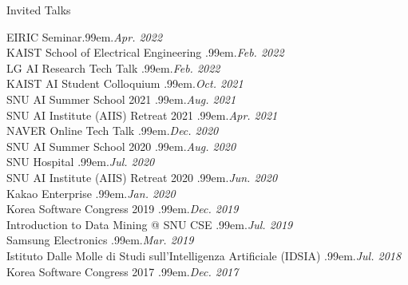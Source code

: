 \documentclass{resume} %
\makeatletter
\newcommand \Dotfill {\leavevmode \cleaders \hb@xt@ .99em{\hss .\hss }\hfill \kern \z@}
\makeatother
\begin{document}
\begin{rSection}{Invited Talks}

EIRIC Seminar\smallskip \Dotfill \emph{Apr. 2022} \\ 
KAIST School of Electrical Engineering \smallskip \Dotfill \emph{Feb. 2022} \\ 
LG AI Research Tech Talk \smallskip \Dotfill \emph{Feb. 2022} \\ 
KAIST AI Student Colloquium \smallskip \Dotfill \emph{Oct. 2021} \\ 
SNU AI Summer School 2021 \smallskip \Dotfill \emph{Aug. 2021} \\ 
SNU AI Institute (AIIS) Retreat 2021 \smallskip \Dotfill \emph{Apr. 2021} \\ 
NAVER Online Tech Talk \smallskip \Dotfill \emph{Dec. 2020} \\ 
SNU AI Summer School 2020 \smallskip \Dotfill \emph{Aug. 2020} \\ 
SNU Hospital \smallskip \Dotfill \emph{Jul. 2020} \\ 
SNU AI Institute (AIIS) Retreat 2020 \smallskip \Dotfill \emph{Jun. 2020}\\ 
Kakao Enterprise \smallskip \Dotfill \emph{Jan. 2020} \\ 
Korea Software Congress 2019 \smallskip \Dotfill \emph{Dec. 2019} \\ 
Introduction to Data Mining @ SNU CSE \smallskip \Dotfill \emph{Jul. 2019} \\ 
Samsung Electronics \smallskip \Dotfill \emph{Mar. 2019} \\ 
Istituto Dalle Molle di Studi sull'Intelligenza Artificiale (IDSIA) \smallskip \Dotfill \emph{Jul. 2018} \\ 
Korea Software Congress 2017 \smallskip \Dotfill \emph{Dec. 2017}

\end{rSection}

\end{document}
